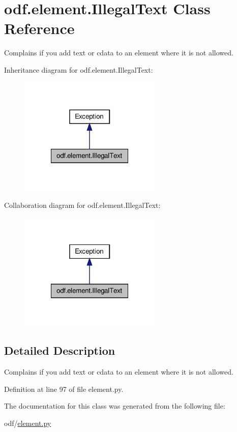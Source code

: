 \hypertarget{classodf_1_1element_1_1IllegalText}{\section{odf.\+element.\+Illegal\+Text Class Reference}
\label{classodf_1_1element_1_1IllegalText}
}


Complains if you add text or cdata to an element where it is not allowed.  




Inheritance diagram for odf.\+element.\+Illegal\+Text\+:
\nopagebreak
\begin{figure}[H]
\begin{center}
\leavevmode
\includegraphics[width=192pt]{classodf_1_1element_1_1IllegalText__inherit__graph}
\end{center}
\end{figure}


Collaboration diagram for odf.\+element.\+Illegal\+Text\+:
\nopagebreak
\begin{figure}[H]
\begin{center}
\leavevmode
\includegraphics[width=192pt]{classodf_1_1element_1_1IllegalText__coll__graph}
\end{center}
\end{figure}


\subsection{Detailed Description}
Complains if you add text or cdata to an element where it is not allowed. 

Definition at line 97 of file element.\+py.



The documentation for this class was generated from the following file\+:\begin{DoxyCompactItemize}
\item 
odf/\hyperlink{element_8py}{element.\+py}\end{DoxyCompactItemize}
